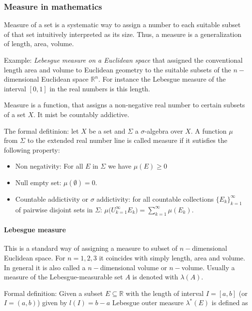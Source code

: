 \subsubsection*{Measure in mathematics}

Measure of a set is a systematic way to assign a number to each suitable subset of that set intuitively interpreted as its size. 
Thus, a measure is a generalization of length, area, volume. 

Example: \textit{Lebesgue measure on a Euclidean space} that assigned the conventional length area and volume to Euclidean geometry to the suitable subsets of the $n-$dimensional Euclidean space $\mathbb{R}^n$. 
For instance the Lebesgue measure of the interval $[0,1]$ in the real numbers is this length. 

Measure is a function, that assigns a non-negative real number to certain subsets of a set $X$. It mist be countably addictive. 

The formal defitinion: 
let $X$ be a set and $\Sigma$ a $\sigma$-algebra over $X$. A function $\mu$ from $\Sigma$ to the extended real number line is called measure if it sutisfies the following property:
\begin{itemize}
    \item Non negativity: For all $E$ in $\Sigma$ we have $\mu(E)\geq 0$
    \item Null empty set: $\mu(\emptyset) = 0$.
    \item Countable addictivity or $\sigma$ addictivity: for all countable collections $\{E_k\}_{k=1}^{\infty}$ of pairwise disjoint sets in $\Sigma$: $\mu\Big(U_{k=1}^{\infty}E_k\Big) = \sum_{k=1}^{\infty}\mu(E_k)$.
\end{itemize}

\paragraph{Lebesgue measure}

This is a standard way of assigning a measure to subset of $n-$dimensional Euclidean space. 
For $n=1,2,3$ it coincides with simply length, area and volume. 
In general it is also called a $n-$dimensional volume or $n-$volume. 
Usually a measure of the Lebesgue-measurable set $A$ is denoted with $\lambda(A)$. 

Formal definition: 
Given a subset $E\subseteq\mathbb{R}$ with the length of interval $I=[a,b]$ (or $I=(a,b)$) given by $l(I) = b-a$ Lebesgue outer measure $\lambda^*(E)$ is defined as 

